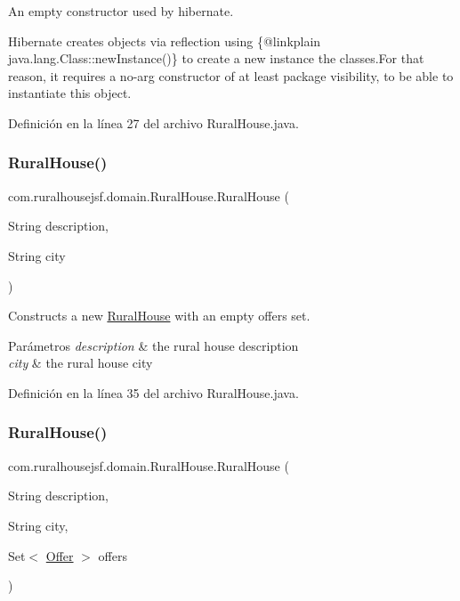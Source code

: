 An empty constructor used by hibernate. 

Hibernate creates objects via reflection using \{@linkplain java.\+lang.\+Class\+::new\+Instance()\} to create a new instance the classes.\+For that reason, it requires a no-\/arg constructor of at least package visibility, to be able to instantiate this object. 

Definición en la línea 27 del archivo Rural\+House.\+java.

\mbox{\label{a00188_aa3488a4d0e876307f91f80784a5538a5}} 
\subsubsection{\texorpdfstring{RuralHouse()}{RuralHouse()}\hspace{0.1cm}{\footnotesize\ttfamily [2/3]}}
{\footnotesize\ttfamily com.\+ruralhousejsf.\+domain.\+Rural\+House.\+Rural\+House (\begin{DoxyParamCaption}\item[{String}]{description,  }\item[{String}]{city }\end{DoxyParamCaption})}



Constructs a new \mbox{\hyperlink{a00188}{Rural\+House}} with an empty offers set. 


\begin{DoxyParams}{Parámetros}
{\em description} & the rural house description \\
\hline
{\em city} & the rural house city \\
\hline
\end{DoxyParams}


Definición en la línea 35 del archivo Rural\+House.\+java.

\mbox{\label{a00188_a7a4e2da81d0c806e058f446b4c657458}} 
\subsubsection{\texorpdfstring{RuralHouse()}{RuralHouse()}\hspace{0.1cm}{\footnotesize\ttfamily [3/3]}}
{\footnotesize\ttfamily com.\+ruralhousejsf.\+domain.\+Rural\+House.\+Rural\+House (\begin{DoxyParamCaption}\item[{String}]{description,  }\item[{String}]{city,  }\item[{Set$<$ \mbox{\hyperlink{a00184}{Offer}} $>$}]{offers }\end{DoxyParamCaption})}



